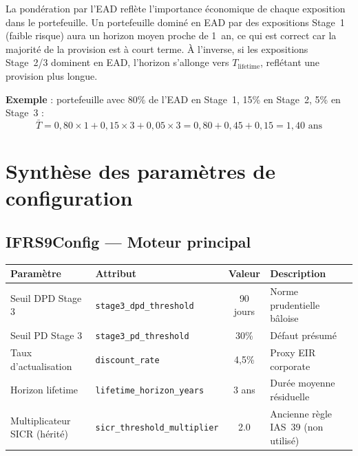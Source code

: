\documentclass[12pt,a4paper]{article}
\begin{document}
\begin{interpretbox}
La pond\'eration par l'EAD refl\`ete l'importance \'economique de chaque exposition dans le portefeuille. Un portefeuille domin\'e en EAD par des expositions Stage~1 (faible risque) aura un horizon moyen proche de 1~an, ce qui est correct car la majorit\'e de la provision est \`a court terme. \`A l'inverse, si les expositions Stage~2/3 dominent en EAD, l'horizon s'allonge vers $T_{\text{lifetime}}$, refl\'etant une provision plus longue.
\end{interpretbox}

\textbf{Exemple} : portefeuille avec 80\% de l'EAD en Stage~1, 15\% en Stage~2, 5\% en Stage~3 :
\[
\bar{T} = 0{,}80 \times 1 + 0{,}15 \times 3 + 0{,}05 \times 3 = 0{,}80 + 0{,}45 + 0{,}15 = 1{,}40\text{ ans}
\]

\newpage
\section{Synth\`ese des param\`etres de configuration}
\label{sec:config}

\subsection{IFRS9Config --- Moteur principal}

\begin{center}
\begin{tabular}{llcl}
\toprule
\textbf{Param\`etre} & \textbf{Attribut} & \textbf{Valeur} & \textbf{Description} \\
\midrule
Seuil DPD Stage 3       & \texttt{stage3\_dpd\_threshold}    & 90 jours & Norme prudentielle b\^aloise \\
Seuil PD Stage 3         & \texttt{stage3\_pd\_threshold}     & 30\%     & D\'efaut pr\'esum\'e \\
Taux d'actualisation     & \texttt{discount\_rate}            & 4,5\%    & Proxy EIR corporate \\
Horizon lifetime         & \texttt{lifetime\_horizon\_years}  & 3 ans    & Dur\'ee moyenne r\'esiduelle \\
Multiplicateur SICR (h\'erit\'e)  & \texttt{sicr\_threshold\_multiplier} & 2.0 & Ancienne r\`egle IAS~39 (non utilis\'e)\footnotemark \\
\bottomrule
\end{tabular}
\end{center}
\end{document}
